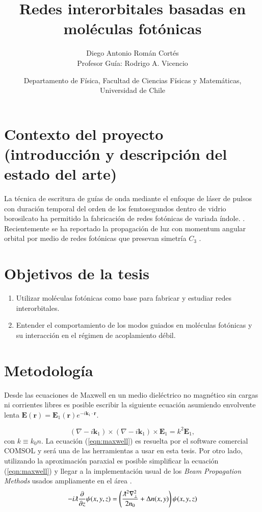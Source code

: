 \documentclass{article}
\author{Diego Antonio Román Cortés\\Profesor Guía: Rodrigo A. Vicencio}
\date{Departamento de Física, Facultad de Ciencias Físicas y Matemáticas, Universidad de Chile}
\title{Redes interorbitales basadas en moléculas fotónicas}
\begin{document}
 \maketitle

\section{Contexto del proyecto (introducción y descripción del estado del arte)}
	La técnica de escritura de guías de onda mediante el enfoque de láser de pulsos con duración temporal del orden de los femtosegundos dentro de vidrio borosilcato ha permitido la fabricación de redes fotónicas de variada índole. \cite{interorbital}. Recientemente se ha reportado la propagación de luz con momentum angular orbital por medio de redes fotónicas que presevan simetría $C_3$ \cite{vortex}.
\section{Objetivos de la tesis}
\begin{enumerate}
	\item Utilizar moléculas fotónicas como base para fabricar y estudiar redes interorbitales.
	\item Entender el comportamiento de los modos guiados en moléculas fotónicas y su interacción en el régimen de acoplamiento débil.
\end{enumerate}
\section{Metodología}

Desde las ecuaciones de Maxwell en un medio dieléctrico no magnético sin cargas ni corrientes libres es posible escribir la siguiente ecuación asumiendo envolvente lenta $\textbf{E}(\textbf{r}) = \textbf{E}_1(\textbf{r}) e^{-i \textbf{k}_1 \cdot \textbf{r}}$.

\begin{equation}
	(\nabla-i\textbf{k}_1)\times(\nabla-i\textbf{k}_1)\times \textbf{E}_1 = k^2 \textbf{E}_1,
	 \label{eqn:maxwell}
\end{equation}
con $k \equiv k_0 n$.
La ecuación (\ref{eqn:maxwell}) es resuelta por el software comercial COMSOL y será una de las herramientas a usar en esta tesis. Por otro lado, utilizando la aproximación paraxial es posible simplificar la ecuación (\ref{eqn:maxwell}) y llegar a la implementación usual de los \textit{Beam Propagation Methods} usados ampliamente en el área \cite{bpm}.
\begin{equation}
	-i\lambdabar\frac{\partial}{\partial z}\psi(x,y,z) = \left(\frac{\lambdabar^2\nabla_\perp^2}{2n_0} + \Delta n(x,y)\right) \psi (x,y,z) \label{eqn:paraxial}
\end{equation}
\end{document}
